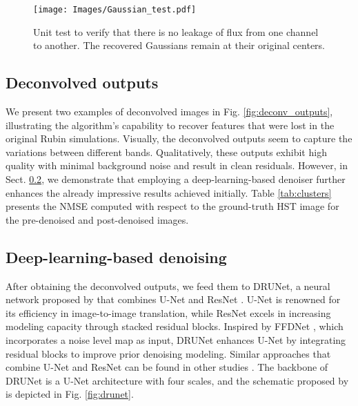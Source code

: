\documentclass[traditabstract]{aa}
\begin{document}
\begin{figure}[h!]
    \centering
    \label{subfig:flux_leakage}\texttt{[image: Images/Gaussian\_test.pdf]}

    \caption{Unit test to verify that there is no leakage of flux from one channel to another. The recovered Gaussians remain at their original centers.}
    \label{fig:flux_leakage}
\end{figure}

\subsection{Deconvolved outputs}
\label{sec:deconv}

We present two examples of deconvolved images in Fig. \ref{fig:deconv_outputs}, illustrating the algorithm's capability to recover features that were lost in the original Rubin simulations. Visually, the deconvolved outputs seem to capture the variations between different bands. Qualitatively, these outputs exhibit high quality with minimal background noise and result in clean residuals. However, in Sect. \ref{sec:denoise}, we demonstrate that employing a deep-learning-based denoiser further enhances the already impressive results achieved initially. Table \ref{tab:clusters} presents the NMSE computed with respect to the ground-truth HST image for the pre-denoised and post-denoised images.


\subsection{Deep-learning-based denoising}
\label{sec:denoise}

After obtaining the deconvolved outputs, we feed them to DRUNet, a neural network proposed by \cite{drunet} that combines U-Net \citep{ronnenberger2015unet} and ResNet \citep{resnet}. U-Net  is renowned for its efficiency in image-to-image translation, while ResNet excels in increasing modeling capacity through stacked residual blocks. Inspired by FFDNet \citep{ffdnet}, which incorporates a noise level map as input, DRUNet enhances U-Net by integrating residual blocks to improve prior denoising modeling. Similar approaches that combine U-Net and ResNet can be found in other studies \citep{road_ext, VenkateshG2018ADR}. The backbone of DRUNet is a U-Net architecture with four scales, and the schematic proposed by \cite{drunet} is depicted in Fig. \ref{fig:drunet}. 
\end{document}

